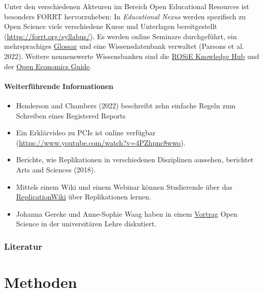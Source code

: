 \documentclass[
  letterpaper,
  DIV=11,
  numbers=noendperiod]{scrreprt}
\begin{document}
Unter den verschiedenen Akteuren im Bereich Open Educational Resources
ist besonders FORRT hervorzuheben: In \emph{Educational Nexus} werden
spezifisch zu Open Science viele verschiedene Kurse und Unterlagen
bereitgestellt (\url{https://forrt.org/syllabus/}). Es werden online
Seminare durchgeführt, ein mehrsprachiges
\href{https://forrt.org/glossary/german/}{Glossar} und eine
Wissensdatenbank verwaltet (Parsons et al. 2022). Weitere nennenswerte
Wissensbanken sind die
\href{https://rosie-project.eu/knowledge-hub/\#!training/health-and-life-sciences}{ROSiE
Knowledge Hub} und der \href{https://openeconomics.zbw.eu/}{Open
Economics Guide}.

\subsubsection{Weiterführende
Informationen}\label{weiterfuxfchrende-informationen-3}

\begin{itemize}
\item
  Henderson and Chambers (2022) beschreibt zehn einfache Regeln zum
  Schreiben eines Registered Reports
\item
  Ein Erklärvideo zu PCIs ist online verfügbar
  (\url{https://www.youtube.com/watch?v=4PZhpnc8wwo}).
\item
  Berichte, wie Replikationen in verschiedenen Disziplinen aussehen,
  berichtet Arts and Sciences (2018).
\item
  Mittels einem Wiki und einem Webinar können Studierende über das
  \href{https://replication.uni-goettingen.de/wiki/index.php/Webinar_series:_Replicating_empirical_studies_in_economics_-_an_opportunity_for_students}{ReplicationWiki}
  über Replikationen lernen.
\item
  Johanna Gereke und Anne-Sophie Waag haben in einem
  \href{https://leibniz-psychology.org/practices-and-tools-of-open-science/open-science-in-der-lehre}{Vortrag}
  Open Science in der universitären Lehre diskutiert.
\end{itemize}

\subsection{Literatur}\label{literatur-13}

\chapter{Methoden}\label{methoden-1}
\end{document}
